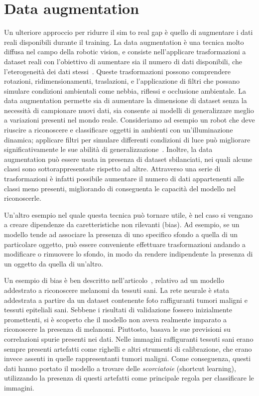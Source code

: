 \documentclass[12pt]{report}
\begin{document}
\section{Data augmentation}
\label{sec:augmentation}

Un ulteriore approccio per ridurre il sim to real gap è quello di augmentare i dati reali disponibili durante il training. La data augmentation è una tecnica molto diffusa nel campo della robotic vision, e consiste nell'applicare trasformazioni a dataset reali con l'obiettivo di aumentare sia il numero di dati disponibili, che l'eterogeneità dei dati stessi~\cite{Shorten2019}. Queste trasformazioni possono comprendere rotazioni, ridimensionamenti, traslazioni, e l'applicazione di filtri che possano simulare condizioni ambientali come nebbia, riflessi e occlusione ambientale. La data augmentation permette sia di aumentare la dimensione di dataset senza la necessità di campionare nuovi dati, sia consente ai modelli di generalizzare meglio a variazioni presenti nel mondo reale. Consideriamo ad esempio un robot che deve riuscire a riconoscere e classificare oggetti in ambienti con un'illuminazione dinamica; applicare filtri per simulare differenti condizioni di luce può migliorare significativamente le sue abilità di generalizzazione~\cite{NEURIPS2021_fb4c4860}. Inoltre, la data augmentation può essere usata in presenza di dataset sbilanciati, nei quali alcune classi sono sottorappresentate rispetto ad altre. Attraverso una serie di trasformazioni è infatti possibile aumentare il numero di dati appartenenti alle classi meno presenti, migliorando di conseguenta le capacità del modello nel riconoscerle.

Un'altro esempio nel quale questa tecnica può tornare utile, è nel caso si vengano a creare dipendenze da caretteristiche non rilevanti (bias). Ad esempio, se un modello tende ad associare la presenza di uno specifico sfondo a quella di un particolare oggetto, può essere conveniente effettuare trasformazioni andando a modificare o rimuovere lo sfondo, in modo da rendere indipendente la presenza di un oggetto da quella di un'altro.

Un esempio di bias è ben descritto nell'articolo~\cite{diagnostics12010040}, relativo ad un modello addestrato a riconoscere melanomi da tessuti sani. La rete neurale è stata addestrata a partire da un dataset contenente foto raffiguranti tumori maligni e tessuti epiteliali sani. Sebbene i risultati di validazione fossero inizialmente promettenti, si è scoperto che il modello non aveva realmente imparato a riconoscere la presenza di melanomi. Piuttosto, basava le sue previsioni su correlazioni spurie presenti nei dati. Nelle immagini raffiguranti tessuti sani erano sempre presenti artefatti come righelli e altri strumenti di calibrazione, che erano invece assenti in quelle rappresentanti tumori maligni. Come conseguenza, questi dati hanno portato il modello a trovare delle \textit{scorciatoie} (shortcut learning), utilizzando la presenza di questi artefatti come principale regola per classificare le immagini.
\end{document}
